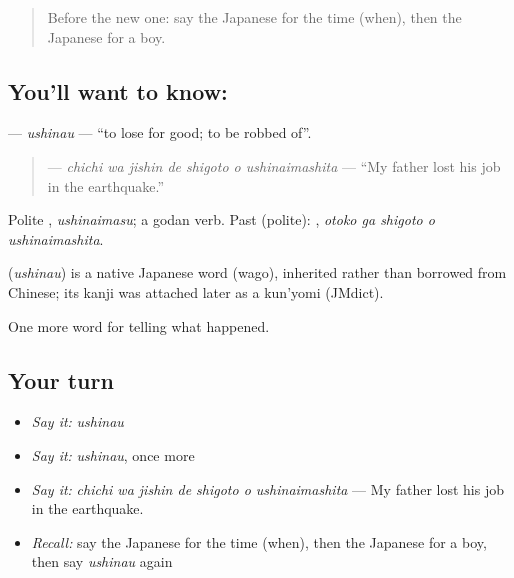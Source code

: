 \label{lesson:JA-C311-ushinau}



\begin{quote}
Before the new one: say the Japanese for the time (when), then the Japanese for a boy.
\end{quote}

\subsection*{You'll want to know: }
\textbf{} — \emph{ushinau} — \textquotedblleft{}to lose for good; to be robbed of\textquotedblright{}.

\begin{quote}
\textbf{   } — \emph{chichi wa jishin de shigoto o ushinaimashita} — \textquotedblleft{}My father lost his job in the earthquake.\textquotedblright{}
\end{quote}

Polite \textbf{}, \emph{ushinaimasu}; a godan verb. Past (polite): \textbf{  }, \emph{otoko ga shigoto o ushinaimashita}.

\begin{cousinweb}
\textbf{} (\emph{ushinau}) is a native Japanese word (wago), inherited rather than borrowed from Chinese; its kanji was attached later as a kun'yomi (JMdict).
\end{cousinweb}

\begin{grammarlens}[title={What you've built}]
One more word for telling what happened.
\end{grammarlens}

\subsection*{Your turn}
\begin{itemize}
\raggedright
  \item \emph{Say it:} \emph{ushinau}
  \item \emph{Say it:} \emph{ushinau}, once more
  \item \emph{Say it:} \emph{chichi wa jishin de shigoto o ushinaimashita} — My father lost his job in the earthquake.
  \item \emph{Recall:} say the Japanese for the time (when), then the Japanese for a boy, then say \emph{ushinau} again
\end{itemize}

